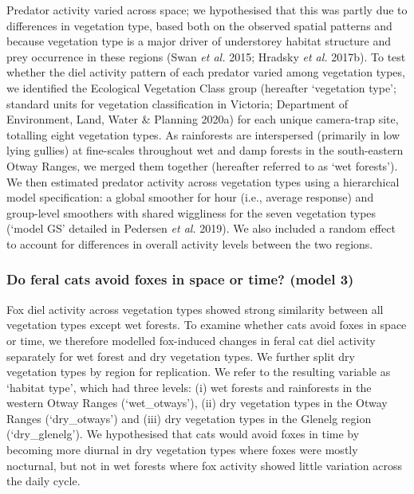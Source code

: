 \documentclass[11pt,a4paper,titlepage,twoside,openright]{style/unimelbthesis}
\begin{document}
\begin{mainmatter}
Predator activity varied across space; we hypothesised that this was partly due to differences in vegetation type, based both on the observed spatial patterns and because vegetation type is a major driver of understorey habitat structure and prey occurrence in these regions (Swan \emph{et al.} 2015; Hradsky \emph{et al.} 2017b). To test whether the diel activity pattern of each predator varied among vegetation types, we identified the Ecological Vegetation Class group (hereafter `vegetation type'; standard units for vegetation classification in Victoria; Department of Environment, Land, Water \& Planning 2020a) for each unique camera-trap site, totalling eight vegetation types. As rainforests are interspersed (primarily in low lying gullies) at fine-scales throughout wet and damp forests in the south-eastern Otway Ranges, we merged them together (hereafter referred to as `wet forests'). We then estimated predator activity across vegetation types using a hierarchical model specification: a global smoother for hour (i.e., average response) and group-level smoothers with shared wiggliness for the seven vegetation types (`model GS' detailed in Pedersen \emph{et al.} 2019). We also included a random effect to account for differences in overall activity levels between the two regions.

\hypertarget{do-feral-cats-avoid-foxes-in-space-or-time-model-3}{%
\subsubsection{Do feral cats avoid foxes in space or time? (model 3)}\label{do-feral-cats-avoid-foxes-in-space-or-time-model-3}}

Fox diel activity across vegetation types showed strong similarity between all vegetation types except wet forests. To examine whether cats avoid foxes in space or time, we therefore modelled fox-induced changes in feral cat diel activity separately for wet forest and dry vegetation types. We further split dry vegetation types by region for replication. We refer to the resulting variable as `habitat type', which had three levels: (i) wet forests and rainforests in the western Otway Ranges (`wet\_otways'), (ii) dry vegetation types in the Otway Ranges (`dry\_otways') and (iii) dry vegetation types in the Glenelg region (`dry\_glenelg'). We hypothesised that cats would avoid foxes in time by becoming more diurnal in dry vegetation types where foxes were mostly nocturnal, but not in wet forests where fox activity showed little variation across the daily cycle.


\end{mainmatter}
\end{document}
